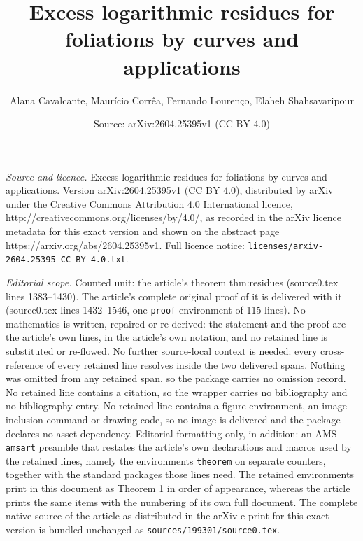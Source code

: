 \documentclass[10pt,a4paper]{amsart}
\title{Excess logarithmic residues for foliations by curves and applications}
\author{Alana Cavalcante, Maur\'icio Corr\^ea, Fernando Louren\c co, Elaheh Shahsavaripour}
\date{Source: arXiv:2604.25395v1 (CC BY 4.0)}
\begin{document}
\maketitle

\noindent\emph{Source and licence.} Excess logarithmic residues for foliations by curves and applications. Version arXiv:2604.25395v1 (CC BY 4.0), distributed by arXiv under the Creative Commons Attribution 4.0 International licence, http://creativecommons.org/licenses/by/4.0/, as recorded in the arXiv licence metadata for this exact version and shown on the abstract page https://arxiv.org/abs/2604.25395v1. Full licence notice: \texttt{licenses/arxiv-2604.25395-CC-BY-4.0.txt}.\par\smallskip

\noindent\textit{Editorial scope.} Counted unit: the article's theorem thm:residues (source0.tex lines 1383--1430). The article's complete original proof of it is delivered with it (source0.tex lines 1432--1546, one \texttt{proof} environment of 115 lines). No mathematics is written, repaired or re-derived: the statement and the proof are the article's own lines, in the article's own notation, and no retained line is substituted or re-flowed.  No further source-local context is needed: every cross-reference of every retained line resolves inside the two delivered spans.  Nothing was omitted from any retained span, so the package carries no omission record.  No retained line contains a citation, so the wrapper carries no bibliography and no bibliography entry.  No retained line contains a figure environment, an image-inclusion command or drawing code, so no image is delivered and the package declares no asset dependency.  Editorial formatting only, in addition: an AMS \texttt{amsart} preamble that restates the article's own declarations and macros used by the retained lines, namely the environments \texttt{theorem} on separate counters, together with the standard packages those lines need.  The retained environments print in this document as Theorem 1 in order of appearance, whereas the article prints the same items with the numbering of its own full document.  The complete native source of the article as distributed in the arXiv e-print for this exact version is bundled unchanged as \texttt{sources/199301/source0.tex}.
\end{document}
